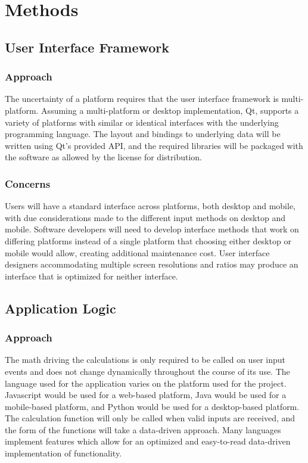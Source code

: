 \documentclass[onecolumn, draftclsnofoot,10pt, compsoc]{IEEEtran}
\begin{document}
\section{Methods}

\subsection{User Interface Framework}
\subsubsection{Approach}
The uncertainty of a platform requires that the user interface framework is multi-platform.
Assuming a multi-platform or desktop implementation, Qt, supports a variety of platforms with similar or identical interfaces with the underlying programming language.
The layout and bindings to underlying data will be written using Qt's provided API, and the required libraries will be packaged with the software as allowed by the license for distribution. 
\subsubsection{Concerns}
Users will have a standard interface across platforms, both desktop and mobile, with due considerations made to the different input methods on desktop and mobile.
Software developers will need to develop interface methods that work on differing platforms instead of a single platform that choosing either desktop or mobile would allow, creating additional maintenance cost.
User interface designers accommodating multiple screen resolutions and ratios may produce an interface that is optimized for neither interface.
\subsection{Application Logic}
\subsubsection{Approach}
The math driving the calculations is only required to be called on user input events and does not change dynamically throughout the course of its use.
The language used for the application varies on the platform used for the project.
Javascript would be used for a web-based platform, Java would be used for a mobile-based platform, and Python would be used for a desktop-based platform.
The calculation function will only be called when valid inputs are received, and the form of the functions will take a data-driven approach.
Many languages implement features which allow for an optimized and easy-to-read data-driven implementation of functionality.
\end{document}
